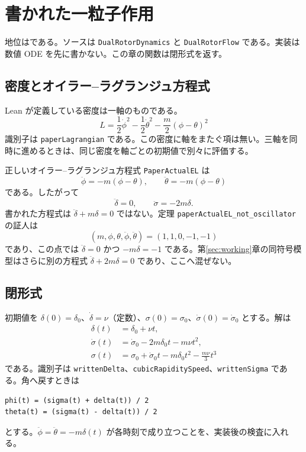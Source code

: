 \section{書かれた一粒子作用}
\label{sec:written}

地位は\dstrec{}である。ソースは \texttt{DualRotorDynamics} と \texttt{DualRotorFlow} である。実装は数値 ODE を先に書かない。この章の関数は閉形式を返す。

\subsection{密度とオイラー--ラグランジュ方程式}

Lean が定義している密度は一軸のものである。
\[
L=\frac12\dot\phi^2-\frac12\dot\theta^2-\frac m2(\phi-\theta)^2
\]
識別子は \texttt{paperLagrangian} である。この密度に軸をまたぐ項は無い。三軸を同時に進めるときは、同じ密度を軸ごとの初期値で別々に評価する。

正しいオイラー--ラグランジュ方程式 \texttt{PaperActualEL} は
\[
\ddot\phi=-m(\phi-\theta),\qquad
\ddot\theta=-m(\phi-\theta)
\]
である。したがって
\[
\ddot\delta=0,\qquad
\ddot\sigma=-2m\delta.
\]
書かれた方程式は \(\ddot\delta+m\delta=0\) ではない。定理 \texttt{paperActualEL\_not\_oscillator} の証人は
\[
(m,\phi,\theta,\ddot\phi,\ddot\theta)=(1,1,0,-1,-1)
\]
であり、この点では \(\ddot\delta=0\) かつ \(-m\delta=-1\) である。第\ref{sec:working}章の同符号模型はさらに別の方程式 \(\ddot\delta+2m\delta=0\) であり、ここへ混ぜない。

\subsection{閉形式}

初期値を \(\delta(0)=\delta_0\)、\(\dot\delta=\nu\)（定数）、\(\sigma(0)=\sigma_0\)、\(\dot\sigma(0)=\dot\sigma_0\) とする。解は
\begin{align}
\delta(t)&=\delta_0+\nu t,\\
\dot\sigma(t)&=\dot\sigma_0-2m\delta_0 t-m\nu t^2,\\
\sigma(t)&=\sigma_0+\dot\sigma_0 t-m\delta_0 t^2-\frac{m\nu}{3}t^3
\end{align}
である。識別子は \texttt{writtenDelta}、\texttt{cubicRapiditySpeed}、\texttt{writtenSigma} である。角へ戻すときは
\begin{verbatim}
phi(t) = (sigma(t) + delta(t)) / 2
theta(t) = (sigma(t) - delta(t)) / 2
\end{verbatim}
とする。\(\ddot\phi=\ddot\theta=-m\delta(t)\) が各時刻で成り立つことを、実装後の検査に入れる。

